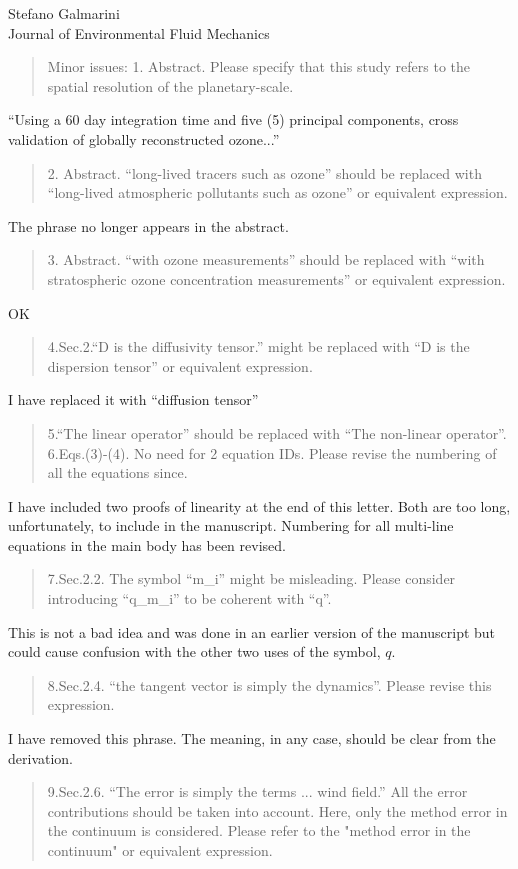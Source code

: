 \documentclass{letter}
\begin{document}
\begin{letter}{Stefano Galmarini\\
Journal of Environmental Fluid Mechanics}
\begin{quote}
Minor issues:
1. Abstract. Please specify that this study refers to the spatial resolution of the planetary-scale.
\end{quote}
``Using a 60 day integration time and five (5) principal components, cross
validation of globally reconstructed ozone...''
\begin{quote}
2. Abstract.  ``long-lived tracers such as ozone'' should be replaced with ``long-lived atmospheric pollutants such as ozone'' or equivalent expression.
\end{quote}
The phrase no longer appears in the abstract.
\begin{quote}
3. Abstract. ``with ozone measurements'' should be replaced with ``with stratospheric ozone concentration measurements'' or equivalent expression.
\end{quote}
OK
\begin{quote}
4.Sec.2.``D is the diffusivity tensor.'' might be replaced with ``D is the dispersion tensor'' or equivalent expression.
\end{quote}
I have replaced it with ``diffusion tensor''
\begin{quote}
5.``The linear operator'' should be replaced with ``The non-linear operator''.
6.Eqs.(3)-(4). No need for 2 equation IDs. Please revise the numbering of all the equations since.
\end{quote}
I have included two proofs of linearity at the end of this letter. Both are too long, unfortunately, to include in the manuscript. Numbering for all multi-line equations in
the main body has been revised.
\begin{quote}
7.Sec.2.2. The symbol ``m\_i'' might be misleading. Please consider introducing ``q\_m\_i'' to be coherent with ``q''.
\end{quote}
This is not a bad idea and was done in an earlier version of the manuscript but could cause confusion with the other two uses of the symbol, $q$.
\begin{quote}
8.Sec.2.4. ``the tangent vector is simply the dynamics''. Please revise this expression.
\end{quote}
I have removed this phrase. The meaning, in any case, should be clear from the derivation.
\begin{quote}
9.Sec.2.6. ``The error is simply the terms ... wind field.'' All the error contributions should be taken into account. Here, only the method error in the continuum is considered. Please refer to the "method error in the continuum" or equivalent expression.

\end{quote}
\end{letter}
\end{document}

